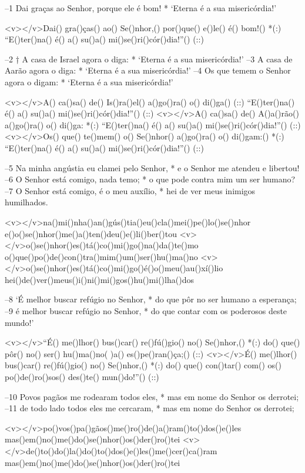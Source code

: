 –1 Dai graças ao Senhor, porque ele é bom! *
‘Eterna é a sua misericórdia!’

<v></v>Dai() gra()ças() ao() Se()nhor,() por()que() e()le() é() bom!() *(:)
``E()ter()na() é() a() su()a() mi()se()ri()cór()dia!''() (::)

–2 † A casa de Israel agora o diga: *
‘Eterna é a sua misericórdia!’
–3 A casa de Aarão agora o diga: *
‘Eterna é a sua misericórdia!’
–4 Os que temem o Senhor agora o digam: *
‘Eterna é a sua misericórdia!’

<v></v>A() ca()sa() de() Is()ra()el() a()go()ra() o() di()ga() (::)
``E()ter()na() é() a() su()a() mi()se()ri()cór()dia!''() (::)
<v></v>A() ca()sa() de() A()a()rão() a()go()ra() o() di()ga: *(:)
``E()ter()na() é() a() su()a() mi()se()ri()cór()dia!''() (::)
<v></v>Os() que() te()mem() o() Se()nhor() a()go()ra() o() di()gam:() *(:)
``E()ter()na() é() a() su()a() mi()se()ri()cór()dia!''() (::)

–5 Na minha angústia eu clamei pelo Senhor, *
e o Senhor me atendeu e libertou!
–6 O Senhor está comigo, nada temo; *
o que pode contra mim um ser humano?
–7 O Senhor está comigo, é o meu auxílio, *
hei de ver meus inimigos humilhados.

<v></v>na()mi()nha()an()gús()tia()eu()cla()mei()pe()lo()se()nhor
e()o()se()nhor()me()a()ten()deu()e()li()ber()tou
<v></v>o()se()nhor()es()tá()co()mi()go()na()da()te()mo
o()que()po()de()con()tra()mim()um()ser()hu()ma()no
<v></v>o()se()nhor()es()tá()co()mi()go()é()o()meu()au()xí()lio
hei()de()ver()meus()i()ni()mi()gos()hu()mi()lha()dos

–8 ‘É melhor buscar refúgio no Senhor, *
do que pôr no ser humano a esperança;
–9 é melhor buscar refúgio no Senhor, *
do que contar com os poderosos deste mundo!’

<v></v>``É() me()lhor() bus()car() re()fú()gio() no() Se()nhor,() *(:)
do() que() pôr() no() ser() hu()ma()no( )a() es()pe()ran()ça;() (::)
<v></v>É() me()lhor() bus()car() re()fú()gio() no() Se()nhor,() *(:)
do() que() con()tar() com() os() po()de()ro()sos() des()te() mun()do!''() (::)

–10 Povos pagãos me rodearam todos eles, *
mas em nome do Senhor os derrotei;
–11 de todo lado todos eles me cercaram, *
mas em nome do Senhor os derrotei;

<v></v>po()vos()pa()gãos()me()ro()de()a()ram()to()dos()e()les
mas()em()no()me()do()se()nhor()os()der()ro()tei
<v></v>de()to()do()la()do()to()dos()e()les()me()cer()ca()ram
mas()em()no()me()do()se()nhor()os()der()ro()tei

